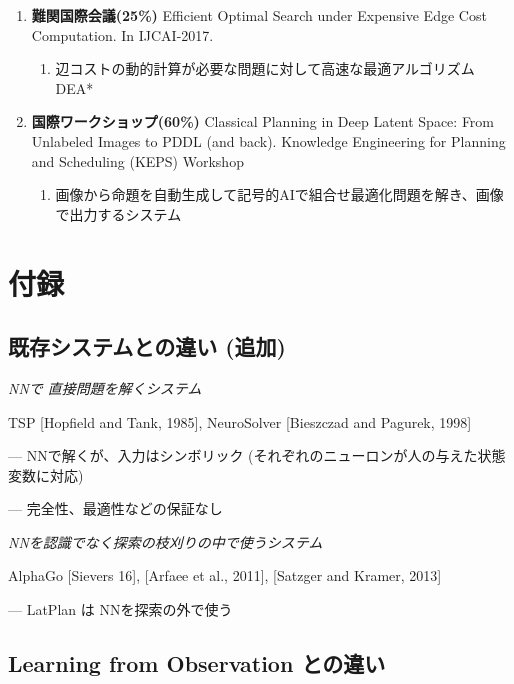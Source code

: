 \begin{smaller}
\begin{enumerate}
\begin{enumerate}
\end{enumerate}
\item \textbf{難関国際会議(25\%)} Efficient Optimal Search under Expensive Edge Cost Computation. In IJCAI-2017.
\begin{enumerate}
\item 辺コストの動的計算が必要な問題に対して高速な最適アルゴリズムDEA*
\end{enumerate}
\item \textbf{国際ワークショップ(60\%)} Classical Planning in Deep Latent Space: From Unlabeled Images to PDDL (and back).
Knowledge Engineering for Planning and Scheduling (KEPS) Workshop
\begin{enumerate}
\item 画像から命題を自動生成して記号的AIで組合せ最適化問題を解き、画像で出力するシステム
\end{enumerate}
\end{enumerate}
\end{smaller}

\section{付録}
\label{sec:orgheadline67}

\begin{expanded}
\startcontents[level-1]
\end{expanded}

\subsection{既存システムとの違い (追加)}
\label{sec:orgheadline48}

\emph{NNで 直接問題を解くシステム}

TSP [Hopfield and Tank, 1985], NeuroSolver [Bieszczad and Pagurek, 1998]

--- NNで解くが、入力はシンボリック (それぞれのニューロンが人の与えた状態変数に対応)

--- 完全性、最適性などの保証なし

\emph{NNを認識でなく探索の枝刈りの中で使うシステム}

AlphaGo [Sievers 16], [Arfaee et al., 2011], [Satzger and Kramer, 2013]

--- LatPlan は NNを探索の外で使う

\subsection{Learning from Observation との違い}
\label{sec:orgheadline49}

